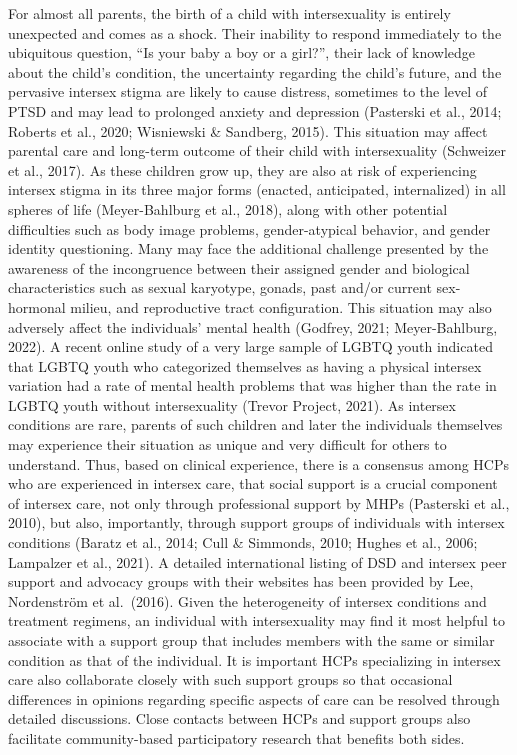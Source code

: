 \documentclass[
]{book}
\begin{document}
For almost all parents, the birth of a child with
intersexuality is entirely unexpected and comes as
a shock. Their inability to respond immediately
to the ubiquitous question, ``Is your baby a boy
or a girl?'', their lack of knowledge about the
child's condition, the uncertainty regarding the
child's future, and the pervasive intersex stigma
are likely to cause distress, sometimes to the level
of PTSD and may lead to prolonged anxiety and
depression (Pasterski et al., 2014; Roberts et al.,
2020; Wisniewski \& Sandberg, 2015). This situation may affect parental care and long-term outcome of their child with intersexuality (Schweizer
et al., 2017). As these children grow up, they are
also at risk of experiencing intersex stigma in its
three major forms (enacted, anticipated, internalized) in all spheres of life (Meyer-Bahlburg et al.,
2018), along with other potential difficulties such
as body image problems, gender-atypical behavior,
and gender identity questioning. Many may face
the additional challenge presented by the awareness of the incongruence between their assigned
gender and biological characteristics such as sexual
karyotype, gonads, past and/or current
sex-hormonal milieu, and reproductive tract configuration. This situation may also adversely affect
the individuals' mental health (Godfrey, 2021;
Meyer-Bahlburg, 2022). A recent online study of
a very large sample of LGBTQ youth indicated
that LGBTQ youth who categorized themselves as
having a physical intersex variation had a rate of
mental health problems that was higher than the
rate in LGBTQ youth without intersexuality
(Trevor Project, 2021). As intersex conditions are
rare, parents of such children and later the individuals themselves may experience their situation
as unique and very difficult for others to understand. Thus, based on clinical experience, there is
a consensus among HCPs who are experienced in
intersex care, that social support is a crucial component of intersex care, not only through professional support by MHPs (Pasterski et al., 2010),
but also, importantly, through support groups of
individuals with intersex conditions (Baratz et al.,
2014; Cull \& Simmonds, 2010; Hughes et al., 2006;
Lampalzer et al., 2021). A detailed international
listing of DSD and intersex peer support and
advocacy groups with their websites has been provided by Lee, Nordenström et al.~(2016). Given
the heterogeneity of intersex conditions and treatment regimens, an individual with intersexuality
may find it most helpful to associate with a support group that includes members with the same
or similar condition as that of the individual. It
is important HCPs specializing in intersex care
also collaborate closely with such support groups
so that occasional differences in opinions regarding
specific aspects of care can be resolved through
detailed discussions. Close contacts between HCPs
and support groups also facilitate community-based
participatory research that benefits both sides.
\end{document}
